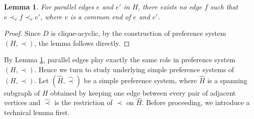 \documentclass[11pt]{article}
\newtheorem{lemma}[theorem]{Lemma}
\numberwithin{theorem}{section}
\begin{document}
\begin{lemma}
\label{lem:reduct1}
For parallel edges $e$ and $e'$ in $H$, there exists no edge $f$ such that $e\prec_v f \prec_v e'$, where $v$ is a common end of $e$ and $e'$.
\end{lemma}
\begin{proof}
Since $D$ is clique-acyclic, by the construction of preference system $(H,\prec)$, the lemma follows directly.
\end{proof}

By Lemma \ref{lem:reduct1}, parallel edges play exactly the same role in preference system $(H,\prec)$. Hence we turn to study underlying simple preference systems of $(H,\prec)$. Let $(\hat{H},\hat\prec)$ be a simple preference system, where $\hat{H}$ is a spanning subgraph of $H$ obtained by keeping one edge between every pair of adjacent vertices and $\hat\prec$ is the restriction of $\prec$ on $\hat{H}$. Before proceeding, we introduce a technical lemma first.
\end{document}
